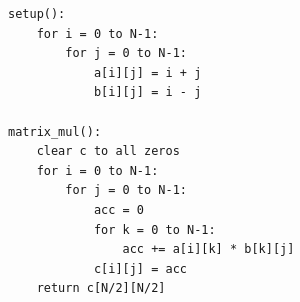 \begin{lstlisting}[caption={Matrix Multiplication pseudocode}, label={lst:matrix_mul}, numbers=none]
setup():
    for i = 0 to N-1:
        for j = 0 to N-1:
            a[i][j] = i + j
            b[i][j] = i - j
 
matrix_mul():
    clear c to all zeros
    for i = 0 to N-1:
        for j = 0 to N-1:
            acc = 0
            for k = 0 to N-1:
                acc += a[i][k] * b[k][j]
            c[i][j] = acc
    return c[N/2][N/2]
\end{lstlisting}